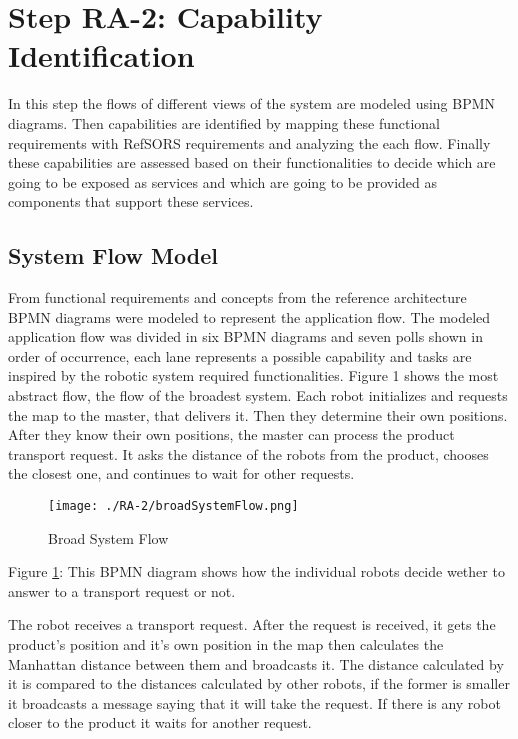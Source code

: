 \section{Step RA-2: Capability Identification}
In this step the flows of different views of the system are modeled using BPMN diagrams. Then capabilities are identified by mapping these functional requirements with RefSORS requirements and analyzing the each flow. Finally these capabilities are assessed based on their functionalities to decide which are going to be exposed as services and which are going to be provided as components that support these services.

\subsection{System Flow Model}
From functional requirements and concepts from the reference architecture BPMN diagrams were modeled to represent the application flow. The modeled application flow was divided in six BPMN diagrams and seven polls shown in order of occurrence, each lane represents a possible capability and tasks are inspired by the robotic system required functionalities.
Figure 1 shows the most abstract flow, the flow of the broadest system. Each robot initializes and requests the map to the master, that delivers it. Then they determine their own positions. After they know their own positions, the master can process the product transport request. It asks the distance of the robots from the product, chooses the closest one, and continues to wait for other requests.

\begin{figure}[ht!]
 \centering
 \texttt{[image: ./RA-2/broadSystemFlow.png]}
 \caption{Broad System Flow}
 \label{fig:broadsystemflow}
\end{figure}

Figure \ref{fig:broadsystemflow}: This BPMN diagram shows how the individual robots decide wether to answer to a transport request or not.

The robot receives a transport request. After the request is received, it gets the product's position and it's own position in the map then calculates the Manhattan distance between them and broadcasts it. The distance calculated by it is compared to the distances calculated by other robots, if the former is smaller it broadcasts a message saying that it will take the request. If there is any robot closer to the product it waits for another request.



